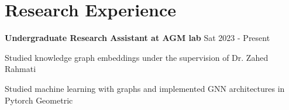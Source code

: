 
\section{Research Experience}
\textbf{Undergraduate Research Assistant at AGM lab} \hfill Sat 2023 - Present 
\begin{compactitem} 
\item Studied knowledge graph embeddings under the supervision of Dr. Zahed Rahmati 
\item Studied machine learning with graphs and implemented GNN architectures in Pytorch Geometric
\end{compactitem}